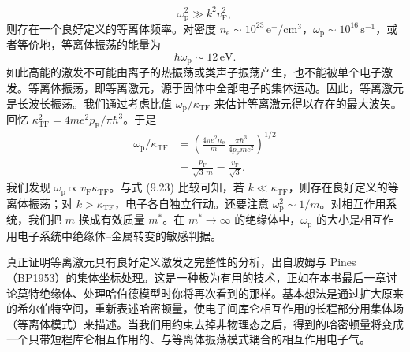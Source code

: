 \begin{equation*}
\omega_{\mathrm{p}}^2\gg k^2v_{\mathrm{F}}^2,\tag{9.23}
\end{equation*}
则存在一个良好定义的等离体频率。对密度 $n_{\mathrm{e}}\sim10^{23}\,\mathrm{e}^{-}/\mathrm{cm}^3$，$\omega_{\mathrm{p}}\sim10^{16}\,\mathrm{s}^{-1}$，或者等价地，等离体振荡的能量为
\begin{equation*}
\hbar\omega_{\mathrm{p}}\sim12\,\mathrm{eV}.\tag{9.24}
\end{equation*}
如此高能的激发不可能由离子的热振荡或类声子振荡产生，也不能被单个电子激发。等离体振荡，即等离激元，源于固体中全部电子的集体运动。因此，等离激元是长波长振荡。我们通过考虑比值 $\omega_{\mathrm{p}}/\kappa_{\mathrm{TF}}$ 来估计等离激元得以存在的最大波矢。回忆 $\kappa_{\mathrm{TF}}^2=4me^2p_{\mathrm{F}}/\pi\hbar^3$。于是
\begin{equation*}
\begin{aligned}
\omega_{\mathrm{p}}/\kappa_{\mathrm{TF}}&=\left(\frac{4\pi e^2n_{\mathrm{e}}}{m}\,\frac{\pi\hbar^3}{4p_{\mathrm{F}}me^2}\right)^{1/2}\\
&=\frac{p_{\mathrm{F}}}{\sqrt{3}\,m}=\frac{v_{\mathrm{F}}}{\sqrt{3}}.
\end{aligned}\tag{9.25}
\end{equation*}
我们发现 $\omega_{\mathrm{p}}\propto v_{\mathrm{F}}\kappa_{\mathrm{TF}}$。与式 (9.23) 比较可知，若 $k\ll\kappa_{\mathrm{TF}}$，则存在良好定义的等离体振荡；对 $k>\kappa_{\mathrm{TF}}$，电子各自独立行动。还要注意 $\omega_{\mathrm{p}}^2\sim1/m$。对相互作用系统，我们把 $m$ 换成有效质量 $m^{*}$。在 $m^{*}\to\infty$ 的绝缘体中，$\omega_{\mathrm{p}}$ 的大小是相互作用电子系统中绝缘体–金属转变的敏感判据。

真正证明等离激元具有良好定义激发之完整性的分析，出自玻姆与 Pines（BP1953）的集体坐标处理。这是一种极为有用的技术，正如在本书最后一章讨论莫特绝缘体、处理哈伯德模型时你将再次看到的那样。基本想法是通过扩大原来的希尔伯特空间，重新表述哈密顿量，使电子间库仑相互作用的长程部分用集体场（等离体模式）来描述。当我们用约束去掉非物理态之后，得到的哈密顿量将变成一个只带短程库仑相互作用的、与等离体振荡模式耦合的相互作用电子气。

